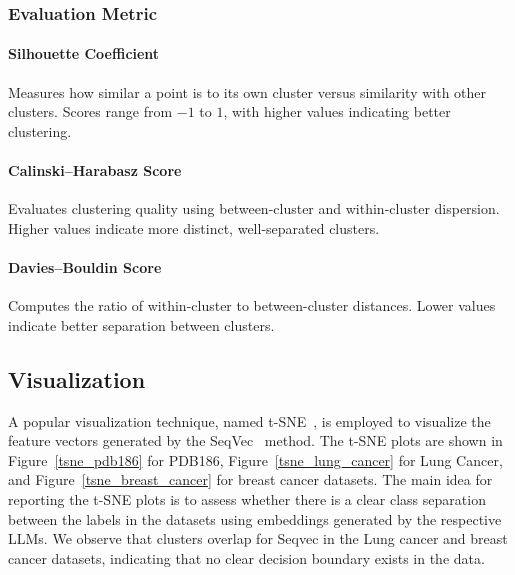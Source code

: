\documentclass[]{Liebert_Author_revised}
\begin{document}
\subsubsection{Evaluation Metric}

\paragraph{Silhouette Coefficient~\citeauthor{rousseeuw1987silhouettes}}
Measures how similar a point is to its own cluster versus similarity with other clusters. Scores range from $-1$ to $1$, with higher values indicating better clustering.

\paragraph{Calinski–Harabasz Score~\citeauthor{calinski1974dendrite}}
Evaluates clustering quality using between-cluster and within-cluster dispersion. Higher values indicate more distinct, well-separated clusters.

\paragraph{Davies–Bouldin Score~\citeauthor{davies1979cluster}}
Computes the ratio of within-cluster to between-cluster distances. Lower values indicate better separation between clusters.



\subsection{Visualization}
A popular visualization technique, named t-SNE~\citeauthor{van2008visualizing}, is employed to visualize the feature vectors generated by the SeqVec~\citeauthor{heinzinger2019modeling} method. 
The t-SNE plots are shown in Figure~\ref{tsne_pdb186}  for PDB186, Figure~\ref{tsne_lung_cancer} for Lung Cancer, and Figure~\ref{tsne_breast_cancer} for breast cancer datasets. The main idea for reporting the t-SNE plots is to assess whether there is a clear class separation between the labels in the datasets using embeddings generated by the respective LLMs. 
We observe that clusters overlap for Seqvec in the Lung cancer and breast cancer datasets, indicating that no clear decision boundary exists in the data.
\end{document}
